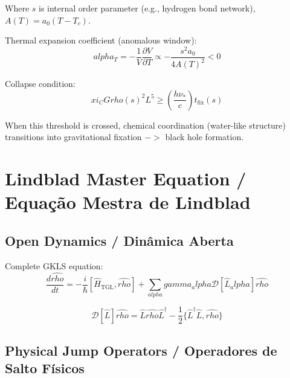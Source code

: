 \documentclass[12pt,a4paper]{article}
\def\to{ -> }%
\def\alpha{alpha}%
\def\gamma{gamma}%
\def\xi{xi}%
\def\rho{rho}%
\begin{document}
Where $s$ is internal order parameter (e.g., hydrogen bond network), $A(T) = a_0(T - T_c)$.

Thermal expansion coefficient (anomalous window):
\begin{equation}
\alpha_T = -\frac{1}{V}\frac{\partial V}{\partial T} \propto -\frac{s^2a_0}{4A(T)^2} < 0
\end{equation}

Collapse condition:
\begin{equation}
\xi_C G\rho(s)^2 L^5 \geq \left(\frac{h\nu_*}{c}\right)t_{\text{fix}}(s)
\end{equation}

When this threshold is crossed, chemical coordination (water-like structure) transitions into gravitational fixation $\to$ black hole formation.

\section{Lindblad Master Equation / Equação Mestra de Lindblad}

\subsection{Open Dynamics / Dinâmica Aberta}

Complete GKLS equation:
\begin{equation}
\boxed{
\frac{d\hat{\rho}}{dt} = -\frac{i}{\hbar}[\hat{H}_{\text{TGL}}, \hat{\rho}] + \sum_{\alpha} \gamma_\alpha \mathcal{D}[\hat{L}_\alpha]\hat{\rho}
}
\end{equation}

\begin{equation}
\mathcal{D}[\hat{L}]\hat{\rho} = \hat{L}\hat{\rho}\hat{L}^\dagger - \frac{1}{2}\{\hat{L}^\dagger\hat{L}, \hat{\rho}\}
\end{equation}

\subsection{Physical Jump Operators / Operadores de Salto Físicos}
\end{document}
